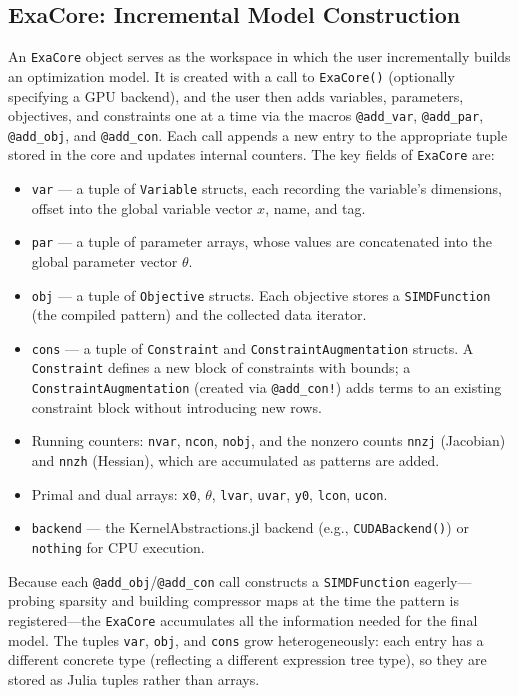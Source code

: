 \documentclass[11pt]{article}
\begin{document}
\subsection{ExaCore: Incremental Model Construction}
\label{sec:data:core}

An \texttt{ExaCore} object serves as the workspace in which the user incrementally builds an optimization model. It is created with a call to \texttt{ExaCore()} (optionally specifying a GPU backend), and the user then adds variables, parameters, objectives, and constraints one at a time via the macros \texttt{@add\_var}, \texttt{@add\_par}, \texttt{@add\_obj}, and \texttt{@add\_con}. Each call appends a new entry to the appropriate tuple stored in the core and updates internal counters. The key fields of \texttt{ExaCore} are:
\begin{itemize}
  \item \texttt{var} --- a tuple of \texttt{Variable} structs, each recording the variable's dimensions, offset into the global variable vector $x$, name, and tag.
  \item \texttt{par} --- a tuple of parameter arrays, whose values are concatenated into the global parameter vector $\theta$.
  \item \texttt{obj} --- a tuple of \texttt{Objective} structs. Each objective stores a \texttt{SIMDFunction} (the compiled pattern) and the collected data iterator.
  \item \texttt{cons} --- a tuple of \texttt{Constraint} and \texttt{ConstraintAugmentation} structs. A \texttt{Constraint} defines a new block of constraints with bounds; a \texttt{ConstraintAugmentation} (created via \texttt{@add\_con!}) adds terms to an existing constraint block without introducing new rows.
  \item Running counters: \texttt{nvar}, \texttt{ncon}, \texttt{nobj}, and the nonzero counts \texttt{nnzj} (Jacobian) and \texttt{nnzh} (Hessian), which are accumulated as patterns are added.
  \item Primal and dual arrays: \texttt{x0}, $\theta$, \texttt{lvar}, \texttt{uvar}, \texttt{y0}, \texttt{lcon}, \texttt{ucon}.
  \item \texttt{backend} --- the KernelAbstractions.jl backend (e.g., \texttt{CUDABackend()}) or \texttt{nothing} for CPU execution.
\end{itemize}
Because each \texttt{@add\_obj}/\texttt{@add\_con} call constructs a \texttt{SIMDFunction} eagerly---probing sparsity and building compressor maps at the time the pattern is registered---the \texttt{ExaCore} accumulates all the information needed for the final model. The tuples \texttt{var}, \texttt{obj}, and \texttt{cons} grow heterogeneously: each entry has a different concrete type (reflecting a different expression tree type), so they are stored as Julia tuples rather than arrays.
\end{document}
